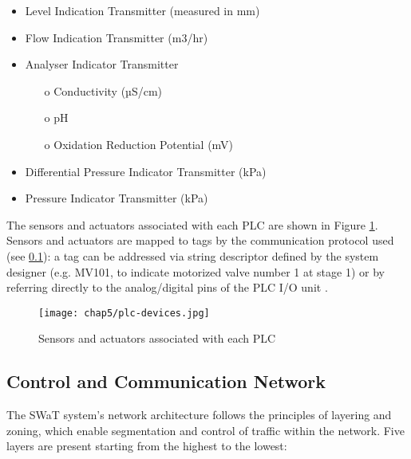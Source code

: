 \begin{itemize}
	\item Level Indication Transmitter (measured in mm)
	\item Flow Indication Transmitter (m3/hr)
	\item Analyser Indicator Transmitter
	\begin{itemize}
		\item[o] Conductivity (µS/cm)
		\item[o] pH
		\item[o] Oxidation Reduction Potential (mV)
	\end{itemize}
	\item Differential Pressure Indicator Transmitter (kPa)
	\item Pressure Indicator Transmitter (kPa)
\end{itemize}
The sensors and actuators associated with each PLC are shown in Figure \ref{fig:5_swat_sensors_plc}. \newline
Sensors and actuators are mapped to tags by the communication protocol used (see \ref{subsec:5_swat_network_architecture}): a tag can be addressed via string descriptor defined by the system designer (e.g. MV101, to indicate motorized valve number 1 at stage 1) or by referring directly to the analog/digital pins of the PLC I/O unit \cite{swat_tippenhauer}.

\begin{figure}[ht]
	\centering
	\texttt{[image: chap5/plc-devices.jpg]}
	\caption{Sensors and actuators associated with each PLC}
	\label{fig:5_swat_sensors_plc}
\end{figure}

\subsection{Control and Communication Network}
\label{subsec:5_swat_network_architecture}
The SWaT system's network architecture follows the principles of layering and zoning, which enable segmentation and control of traffic within the network.
\newline \newline
Five layers are present starting from the highest to the lowest: 

